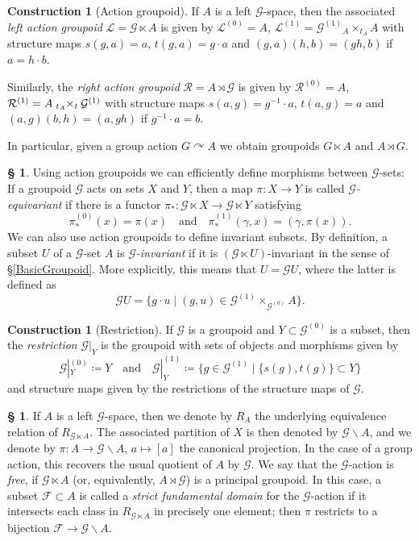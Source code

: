\documentclass[11pt, oneside]{amsart}
\theoremstyle{definition}
\newtheorem{con}[lemma]{Construction}
\newtheorem{no}[lemma]{\S}
\theoremstyle{remark}
\theoremstyle{TheoremNum}
\newcommand\cF{{\mathcal F}}
\newcommand{\cG}{\mathcal{G}}
\newcommand{\qand}{\quad \text{and} \quad}
\begin{document}
\begin{con}[Action groupoid]
If $A$ is a left $\cG$-space, then the associated \emph{left action groupoid} $\mathcal{L} = \cG \ltimes A$ is given by $\mathcal{L}^{(0)} = A$, $\mathcal{L}^{(1)} = \cG^{(1)} {}_A \times_{t_A} A$ with structure maps $s(g,a) = a$, $t(g,a) =g\cdot a$ and
$(g, a)(h,b) = (gh,b)$ if $a = h\cdot b$. 

Similarly, the \emph{right action groupoid} $\mathcal{R} = A \rtimes \cG$ is given by $\mathcal{R}^{(0)} = A$, $\mathcal{R}^{(1)} = A \; {}_{t_A}\negthickspace \times_t \cG^{(1)}$ with structure maps $s(a,g)=g^{-1}\cdot a$, $t(a,g)=a$ and $(a,g)(b,h) = (a,gh) $ if $g^{-1}\cdot a = b$. 

In particular, given a group action $G \curvearrowright A$ we obtain groupoids $G \ltimes A$ and $A \rtimes G$.
 \end{con}
\begin{no}
Using action groupoids we can efficiently define morphisms between $\cG$-sets: If a groupoid $\cG$ acts on sets $X$ and $Y$, then a map $\pi: X \to Y$ is called \emph{$\cG$-equivariant} if there is a functor $\pi_*: \cG \ltimes X \to \cG \ltimes Y$ satisfying
\[
\pi^{(0)}_*(x) = \pi(x) \qand \pi^{(1)}_*(\gamma, x) = (\gamma, \pi(x)).
\]
We can also use action groupoids to define invariant subsets. By definition, a subset $U$ of a $\cG$-set $A$ is \emph{$\cG$-invariant} if it is $(\cG \ltimes U)$-invariant in the sense of \S\ref{BasicGroupoid}. More explicitly, this means that $U = \cG U$, where the latter is defined as
\[
\cG U = \{g \cdot u \mid (g, u) \in \cG^{(1)} \times_{\cG^{(0)}}A\}.
\]
\end{no}
\begin{con}[Restriction] If $\cG$ is a groupoid and $Y \subset \cG^{(0)}$ is a subset, then the  \emph{restriction} $\cG|_Y$ is the groupoid with sets of objects and morphisms given by
\[
\cG|_Y^{(0)} \coloneqq Y \qand \cG|_Y^{(1)} \coloneqq \{g \in \cG^{(1)} \mid \{s(g), t(g)\} \subset Y\}
\]
and structure maps given by the restrictions of the structure maps of $\cG$.
\end{con}

\begin{no} If $A$ is a left $\cG$-space, then we denote by $R_A$ the underlying equivalence relation of $R_{\cG \ltimes A}$. The associated partition of $X$ is then denoted by $\cG\backslash A$, and we denote by $\pi: A \to \cG\backslash A$, $a \mapsto [a]$ the canonical projection. In the case of a group action, this recovers the usual quotient of $A$ by $\cG$. We say that the $\cG$-action is \emph{free}, if $\cG \ltimes A$ (or, equivalently, $A \rtimes \cG$) is a principal groupoid. In this case, 
a subset $\cF \subset A$ is called a \emph{strict fundamental domain} for the $\cG$-action if it intersects each class in $R_{\cG \ltimes A}$ in precisely one element; then $\pi$ restricts to a bijection $\cF \to \cG \backslash A$.
 \end{no}
 
\end{document}
